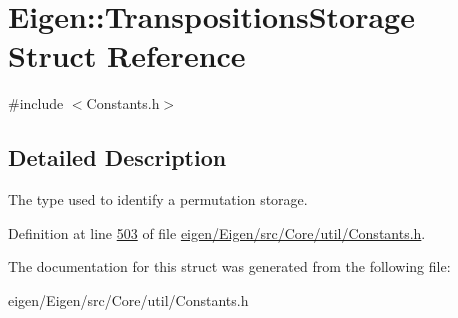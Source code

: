 \hypertarget{struct_eigen_1_1_transpositions_storage}{}\section{Eigen\+:\+:Transpositions\+Storage Struct Reference}
\label{struct_eigen_1_1_transpositions_storage}


{\ttfamily \#include $<$Constants.\+h$>$}



\subsection{Detailed Description}
The type used to identify a permutation storage. 

Definition at line \hyperlink{eigen_2_eigen_2src_2_core_2util_2_constants_8h_source_l00503}{503} of file \hyperlink{eigen_2_eigen_2src_2_core_2util_2_constants_8h_source}{eigen/\+Eigen/src/\+Core/util/\+Constants.\+h}.



The documentation for this struct was generated from the following file\+:\begin{DoxyCompactItemize}
\item 
eigen/\+Eigen/src/\+Core/util/\+Constants.\+h\end{DoxyCompactItemize}
